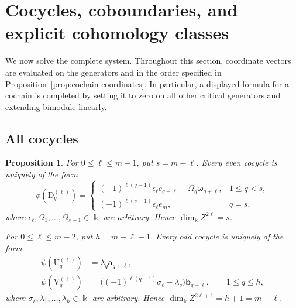 \documentclass[a4paper,11pt,oneside,reqno]{amsart}
\newtheorem{proposition}[theorem]{Proposition}
\theoremstyle{definition}
\numberwithin{equation}{section}
\begin{document}
	\section{Cocycles, coboundaries, and explicit cohomology classes}
	\label{sec:cohomology}
	
	We now solve the complete system.  Throughout this section, coordinate
	vectors are evaluated on the generators and in the order specified in
	Proposition~\ref{prop:cochain-coordinates}.  In particular, a displayed
	formula for a cochain is completed by setting it to zero on all other
	critical generators and extending bimodule-linearly.
	
	\subsection{All cocycles}
	
	\begin{proposition}\label{prop:all-cocycles}
		For $0\leq\ell\leq m-1$, put $s=m-\ell$.
		Every even cocycle is uniquely of the form
		\begin{equation}\label{eq:all-even-cocycles}
			\phi(\mathrm{D}_q^{(\ell)})=
			\begin{cases}
				(-1)^{\ell(q-1)}\epsilon_\ell e_{q+\ell}
				+\Omega_q \boldsymbol{\omega}_{q+\ell},&1\leq q<s,\\
				(-1)^{\ell(s-1)}\epsilon_\ell e_m,&q=s,
			\end{cases}
		\end{equation}
		where $\epsilon_\ell,\Omega_1,\ldots,\Omega_{s-1}\in \Bbbk$ are arbitrary.
		Hence $\dim_{\Bbbk}Z^{2\ell}=s$.
		
		For $0\leq\ell\leq m-2$, put $h=m-\ell-1$.
		Every odd cocycle is uniquely of the form
		\begin{equation}\label{eq:all-odd-cocycles}
			\begin{aligned}
				\psi(\mathrm{U}_q^{(\ell)})&=\lambda_q \mathbf{a}_{q+\ell},\\
				\psi(\mathrm{V}_q^{(\ell)})&=
				\bigl((-1)^{\ell(q-1)}\sigma_\ell-\lambda_q\bigr)\mathbf{b}_{q+\ell},
				\qquad 1\leq q\leq h,
			\end{aligned}
		\end{equation}
		where $\sigma_\ell,\lambda_1,\ldots,\lambda_h\in \Bbbk$ are arbitrary.
		Hence $\dim_{\Bbbk}Z^{2\ell+1}=h+1=m-\ell$.
	\end{proposition}
	
\end{document}
